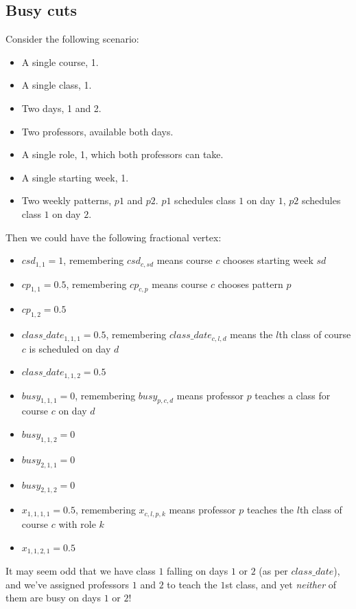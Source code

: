 \subsection{Busy cuts}

Consider the following scenario:
\begin{itemize}
\item A single course, 1.
\item A single class, 1.
\item Two days, 1 and 2.
\item Two professors, available both days.
\item A single role, 1, which both professors can take.
\item A single starting week, 1.
\item Two weekly patterns, $p1$ and $p2$. $p1$ schedules class $1$ on day $1$, $p2$ schedules class $1$ on day $2$.
\end{itemize}

Then we could have the following fractional vertex:

\begin{itemize}
\item $csd_{1, 1} = 1$, remembering $csd_{c, sd}$ means course $c$ chooses starting week $sd$
\item $cp_{1, 1} = 0.5$, remembering $cp_{c, p}$ means course $c$ chooses pattern $p$
\item $cp_{1, 2} = 0.5$
\item $class\_date_{1, 1, 1} = 0.5$, remembering $class\_date_{c, l, d}$ means the $l$th class of course $c$ is scheduled on day $d$
\item $class\_date_{1, 1, 2} = 0.5$
\item $busy_{1, 1, 1} = 0$, remembering $busy_{p, c, d}$ means professor $p$ teaches a class for course $c$ on day $d$
\item $busy_{1, 1, 2} = 0$
\item $busy_{2, 1, 1} = 0$
\item $busy_{2, 1, 2} = 0$
\item $x_{1, 1, 1, 1} = 0.5$, remembering $x_{c, l, p, k}$ means professor $p$ teaches the $l$th class of course $c$ with role $k$
\item $x_{1, 1, 2, 1} = 0.5$
\end{itemize}

It may seem odd that we have class $1$ falling on days $1$ or $2$ (as per $class\_date$), and we've assigned professors $1$ and $2$ to teach the $1$st class, and yet \emph{neither} of them are busy on days $1$ or $2$!

